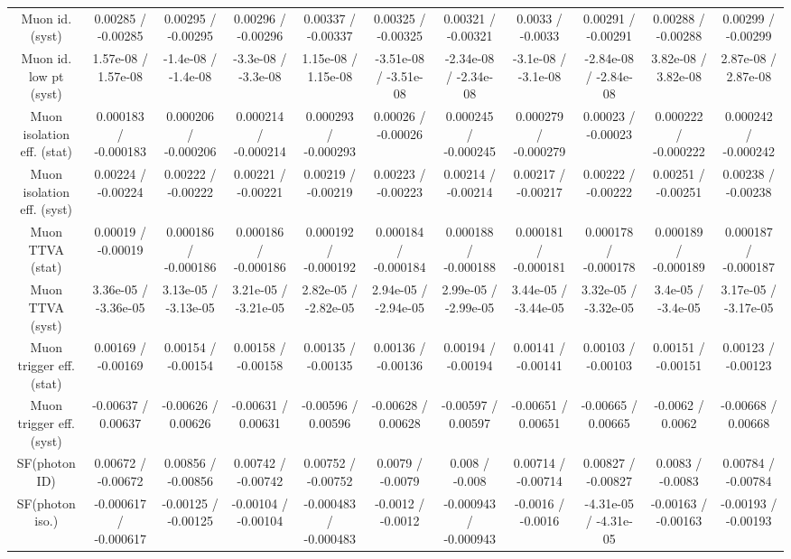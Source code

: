 \begin{table}[htbp]
\begin{center}
\begin{tabular}{|c|c|c|c|c|c|c|c|c|c|c|}
  Muon id. (syst) & 0.00285 / -0.00285 & 0.00295 / -0.00295 & 0.00296 / -0.00296 & 0.00337 / -0.00337 & 0.00325 / -0.00325 & 0.00321 / -0.00321 & 0.0033 / -0.0033 & 0.00291 / -0.00291 & 0.00288 / -0.00288 & 0.00299 / -0.00299 \\ 
  Muon id. low pt (syst) & 1.57e-08 / 1.57e-08 & -1.4e-08 / -1.4e-08 & -3.3e-08 / -3.3e-08 & 1.15e-08 / 1.15e-08 & -3.51e-08 / -3.51e-08 & -2.34e-08 / -2.34e-08 & -3.1e-08 / -3.1e-08 & -2.84e-08 / -2.84e-08 & 3.82e-08 / 3.82e-08 & 2.87e-08 / 2.87e-08 \\ 
  Muon isolation eff. (stat) & 0.000183 / -0.000183 & 0.000206 / -0.000206 & 0.000214 / -0.000214 & 0.000293 / -0.000293 & 0.00026 / -0.00026 & 0.000245 / -0.000245 & 0.000279 / -0.000279 & 0.00023 / -0.00023 & 0.000222 / -0.000222 & 0.000242 / -0.000242 \\ 
  Muon isolation eff. (syst) & 0.00224 / -0.00224 & 0.00222 / -0.00222 & 0.00221 / -0.00221 & 0.00219 / -0.00219 & 0.00223 / -0.00223 & 0.00214 / -0.00214 & 0.00217 / -0.00217 & 0.00222 / -0.00222 & 0.00251 / -0.00251 & 0.00238 / -0.00238 \\ 
  Muon TTVA (stat) & 0.00019 / -0.00019 & 0.000186 / -0.000186 & 0.000186 / -0.000186 & 0.000192 / -0.000192 & 0.000184 / -0.000184 & 0.000188 / -0.000188 & 0.000181 / -0.000181 & 0.000178 / -0.000178 & 0.000189 / -0.000189 & 0.000187 / -0.000187 \\ 
  Muon TTVA (syst) & 3.36e-05 / -3.36e-05 & 3.13e-05 / -3.13e-05 & 3.21e-05 / -3.21e-05 & 2.82e-05 / -2.82e-05 & 2.94e-05 / -2.94e-05 & 2.99e-05 / -2.99e-05 & 3.44e-05 / -3.44e-05 & 3.32e-05 / -3.32e-05 & 3.4e-05 / -3.4e-05 & 3.17e-05 / -3.17e-05 \\ 
  Muon trigger eff. (stat) & 0.00169 / -0.00169 & 0.00154 / -0.00154 & 0.00158 / -0.00158 & 0.00135 / -0.00135 & 0.00136 / -0.00136 & 0.00194 / -0.00194 & 0.00141 / -0.00141 & 0.00103 / -0.00103 & 0.00151 / -0.00151 & 0.00123 / -0.00123 \\ 
  Muon trigger eff. (syst) & -0.00637 / 0.00637 & -0.00626 / 0.00626 & -0.00631 / 0.00631 & -0.00596 / 0.00596 & -0.00628 / 0.00628 & -0.00597 / 0.00597 & -0.00651 / 0.00651 & -0.00665 / 0.00665 & -0.0062 / 0.0062 & -0.00668 / 0.00668 \\ 
  SF(photon ID) & 0.00672 / -0.00672 & 0.00856 / -0.00856 & 0.00742 / -0.00742 & 0.00752 / -0.00752 & 0.0079 / -0.0079 & 0.008 / -0.008 & 0.00714 / -0.00714 & 0.00827 / -0.00827 & 0.0083 / -0.0083 & 0.00784 / -0.00784 \\ 
  SF(photon iso.) & -0.000617 / -0.000617 & -0.00125 / -0.00125 & -0.00104 / -0.00104 & -0.000483 / -0.000483 & -0.0012 / -0.0012 & -0.000943 / -0.000943 & -0.0016 / -0.0016 & -4.31e-05 / -4.31e-05 & -0.00163 / -0.00163 & -0.00193 / -0.00193 \\ 

\end{tabular}
\end{center}
\end{table}
